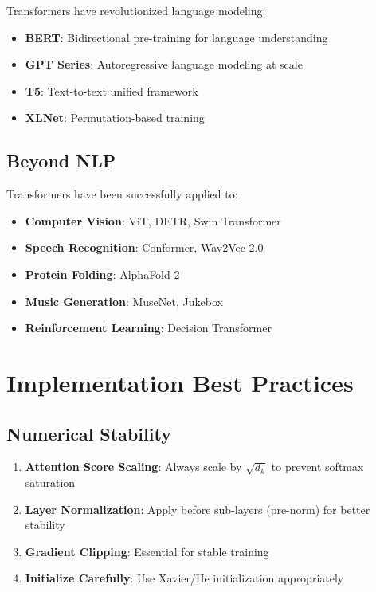 \documentclass[11pt]{article}
\begin{document}
Transformers have revolutionized language modeling:

\begin{itemize}
    \item \textbf{BERT}: Bidirectional pre-training for language understanding
    \item \textbf{GPT Series}: Autoregressive language modeling at scale
    \item \textbf{T5}: Text-to-text unified framework
    \item \textbf{XLNet}: Permutation-based training
\end{itemize}

\subsection{Beyond NLP}

Transformers have been successfully applied to:
\begin{itemize}
    \item \textbf{Computer Vision}: ViT, DETR, Swin Transformer
    \item \textbf{Speech Recognition}: Conformer, Wav2Vec 2.0
    \item \textbf{Protein Folding}: AlphaFold 2
    \item \textbf{Music Generation}: MuseNet, Jukebox
    \item \textbf{Reinforcement Learning}: Decision Transformer
\end{itemize}

\section{Implementation Best Practices}

\subsection{Numerical Stability}

\begin{enumerate}
    \item \textbf{Attention Score Scaling}: Always scale by $\sqrt{d_k}$ to prevent softmax saturation
    \item \textbf{Layer Normalization}: Apply before sub-layers (pre-norm) for better stability
    \item \textbf{Gradient Clipping}: Essential for stable training
    \item \textbf{Initialize Carefully}: Use Xavier/He initialization appropriately
\end{enumerate}
\end{document}
